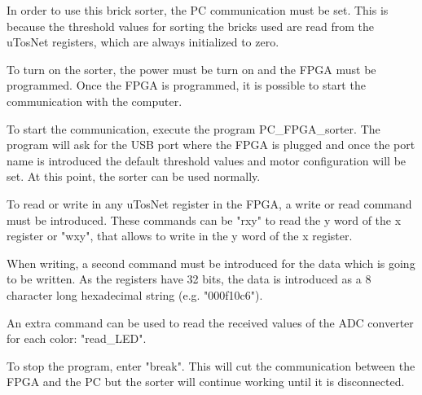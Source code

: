 \label{app:usageguide}


In order to use this brick sorter, the PC communication must be set. This is because the threshold values for sorting the bricks used are read from the uTosNet registers, which are always initialized to zero.

To turn on the sorter, the power must be turn on and the FPGA must be programmed.
Once the FPGA is programmed, it is possible to start the communication with the computer.

To start the communication, execute the program PC\_FPGA\_sorter. The program will ask for the USB port where the FPGA is plugged and once the port name is introduced the default threshold values and motor configuration will be set. At this point, the sorter can be used normally.

To read or write in any uTosNet register in the FPGA, a write or read command must be introduced. These commands can be "rxy" to read the y word of the x register or "wxy", that allows to write in the y word of the x register.

When writing, a second command must be introduced for the data which is going to be written. As the registers have 32 bits, the data is introduced as a 8 character long hexadecimal string (e.g. "000f10c6").

An extra command can be used to read the received values of the ADC converter for each color: "read\_LED".

To stop the program, enter "break". This will cut the communication between the FPGA and the PC but the sorter will continue working until it is disconnected.



